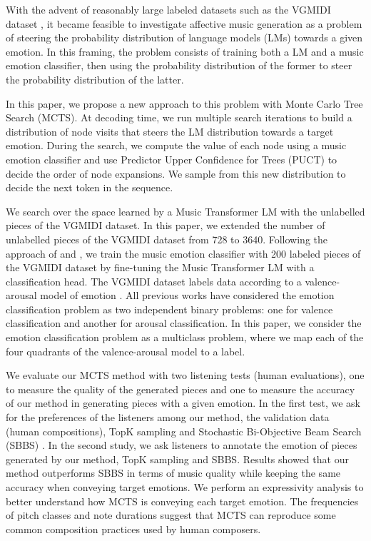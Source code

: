 \newcommand{\imgb}{imgs/ismir21}

With the advent of reasonably large labeled datasets such as the VGMIDI dataset \cite{ferreira_2019}, it became feasible to investigate affective music generation \cite{williams2015investigating} as a problem of steering the probability distribution of language models (LMs) towards a given emotion. In this framing, the problem consists of training both a LM and a music emotion classifier, then using the probability distribution of the former to steer the probability distribution of the latter.

In this paper, we propose a new approach to this problem with Monte Carlo Tree Search (MCTS). At decoding time, we run multiple search iterations to build a distribution of node visits that steers
the LM distribution towards a target emotion. During the search, we compute the value of each node using a music emotion classifier and use Predictor Upper Confidence for Trees (PUCT) to decide the order of node expansions. We sample from this new distribution to decide the next token in the sequence.

We search over the space learned by a Music Transformer LM \cite {huang2018music} with the unlabelled pieces of the VGMIDI dataset. In this paper, we extended the number of unlabelled pieces of the VGMIDI dataset from 728 to 3640. Following the approach of \cite{ferreira_2019} and \cite{ferreira2020computer}, we train the music emotion classifier with 200 labeled pieces of the VGMIDI dataset by fine-tuning the Music Transformer LM with a classification head. The VGMIDI dataset labels data according to a valence-arousal model of emotion \cite{russell1980circumplex}. All previous works have considered the emotion classification problem as two independent binary problems: one for valence classification and another for arousal classification. In this paper, we consider the emotion classification problem as a multiclass problem, where we map each of the four quadrants of the valence-arousal model to a label.

We evaluate our MCTS method with two listening tests (human evaluations), one to measure the quality of the generated pieces and one to measure the accuracy of our method in generating pieces with a given emotion. In the first test, we ask for the preferences of the listeners among our method, the validation data (human compositions), TopK sampling and Stochastic Bi-Objective Beam Search (SBBS) \cite{ferreira2020computer}. In the second study, we ask listeners to annotate the emotion of pieces generated by our method, TopK sampling and SBBS. Results showed that our method outperforms SBBS in terms of music quality while keeping the same accuracy when conveying target emotions. We perform an expressivity analysis \cite{smith2010analyzing} to better understand how MCTS is conveying each target emotion. The frequencies of pitch classes and note
durations suggest that MCTS can reproduce some common composition practices used by human composers.

